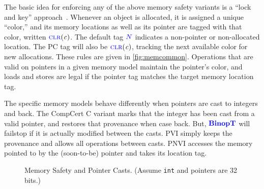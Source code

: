 \documentclass{llncs}
\begin{document}
The basic idea for enforcing any of the above memory safety variants is a ``lock and key'' approach~\cite{Clause07:MemsafeTainting,Azevedo+15}.
Whenever an object is allocated, it is assigned a unique ``color,'' and its memory locations as well
as its pointer are tagged with that color, written \(\textnormal{\color{blue} \sc clr}(\mathit{c})\).
The default tag \({\color{blue} N}\) indicates a non-pointer or non-allocated location.
The PC tag will also be \(\textnormal{\color{blue} \sc clr}(\mathit{c})\),
tracking the next available color for new allocations. These rules are given in \cref{fig:memcommon}.
Operations that are valid on pointers in a given memory model
maintain the pointer's color, and loads and stores are legal if the pointer tag matches the target memory
location tag.

The specific memory models behave differently when pointers are cast to integers and back.
The CompCert C variant marks that the integer has been cast from a valid pointer, and
restores that provenance when case back. But, \(\color{blue} \mathbf{BinopT}\) will failstop if it is
actually modified between the casts. PVI simply keeps the provenance and allows all operations
between casts. PNVI accesses the memory pointed to by the (soon-to-be) pointer and takes its
location tag.

\begin{figure}

\caption{Memory Safety and Pointer Casts. (Assume {\tt int} and pointers are 32 bits.)}
\label{fig:memsafe}
\end{figure}
\end{document}
